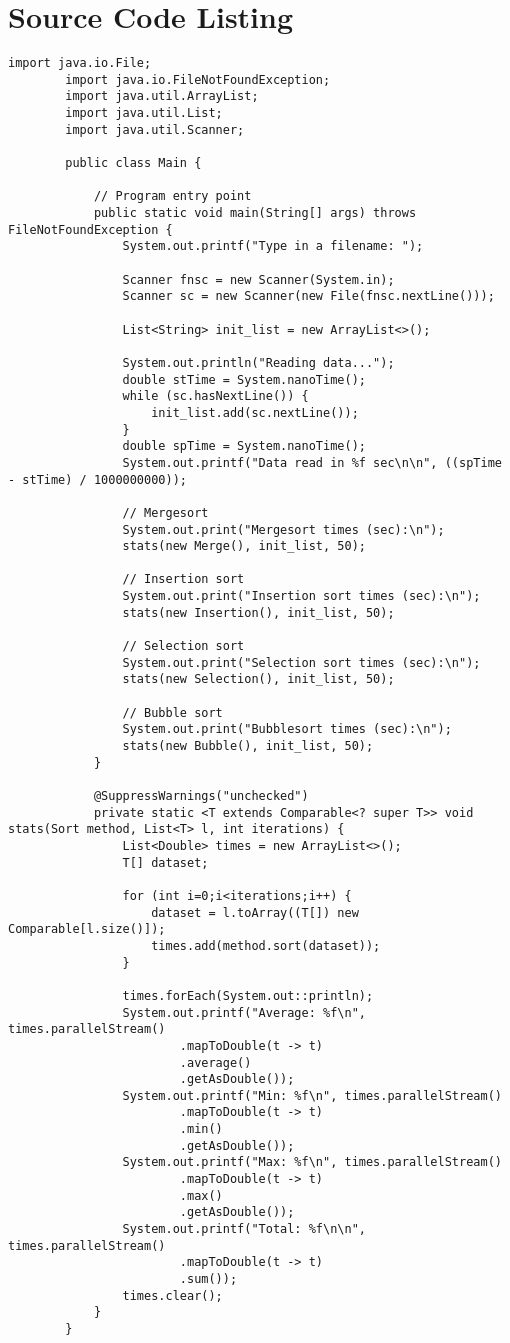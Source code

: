 	\section{Source Code Listing}
	\begin{lstlisting}[caption=Main.java]		
		import java.io.File;
		import java.io.FileNotFoundException;
		import java.util.ArrayList;
		import java.util.List;
		import java.util.Scanner;
		
		public class Main {
		
			// Program entry point
			public static void main(String[] args) throws FileNotFoundException {
				System.out.printf("Type in a filename: ");

				Scanner fnsc = new Scanner(System.in);
				Scanner sc = new Scanner(new File(fnsc.nextLine()));

				List<String> init_list = new ArrayList<>();
				
				System.out.println("Reading data...");
				double stTime = System.nanoTime();
				while (sc.hasNextLine()) {
					init_list.add(sc.nextLine());
				}
				double spTime = System.nanoTime();
				System.out.printf("Data read in %f sec\n\n", ((spTime - stTime) / 1000000000));
				
				// Mergesort
				System.out.print("Mergesort times (sec):\n");
				stats(new Merge(), init_list, 50);
				
				// Insertion sort
				System.out.print("Insertion sort times (sec):\n");
				stats(new Insertion(), init_list, 50);
				
				// Selection sort
				System.out.print("Selection sort times (sec):\n");
				stats(new Selection(), init_list, 50);
				
				// Bubble sort
				System.out.print("Bubblesort times (sec):\n");
				stats(new Bubble(), init_list, 50);
			}
			
			@SuppressWarnings("unchecked")
			private static <T extends Comparable<? super T>> void stats(Sort method, List<T> l, int iterations) {
				List<Double> times = new ArrayList<>();
				T[] dataset;
				
				for (int i=0;i<iterations;i++) {
					dataset = l.toArray((T[]) new Comparable[l.size()]);
					times.add(method.sort(dataset));
				}
				
				times.forEach(System.out::println);
				System.out.printf("Average: %f\n", times.parallelStream()
						.mapToDouble(t -> t)
						.average()
						.getAsDouble());
				System.out.printf("Min: %f\n", times.parallelStream()
						.mapToDouble(t -> t)
						.min()
						.getAsDouble());
				System.out.printf("Max: %f\n", times.parallelStream()
						.mapToDouble(t -> t)
						.max()
						.getAsDouble());
				System.out.printf("Total: %f\n\n", times.parallelStream()
						.mapToDouble(t -> t)
						.sum());
				times.clear();
			}
		}
	\end{lstlisting}
